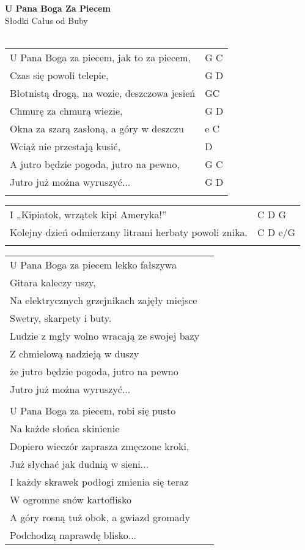 \documentclass[a5paper]{article}
\begin{document}


\noindent
\fontsize{12pt}{15pt}\selectfont
\textbf{U Pana Boga Za Piecem} \\
\fontsize{8pt}{10pt}\selectfont
Słodki Całus od Buby \\ \\
\fontsize{10pt}{12pt}\selectfont
{}
\begin{tabular}{@{}p{9.5cm}p{3cm}@{}}
\noindent
U Pana Boga za piecem, jak to za piecem, & G C \\
Czas się powoli telepie, & G D \\
Błotnistą drogą, na wozie, deszczowa jesień & GC \\
Chmurę za chmurą wiezie, & G D \\
Okna za szarą zasłoną, a góry w deszczu & e C \\
Wciąż nie przestają kusić, & D \\
A jutro będzie pogoda, jutro na pewno, & G C \\
Jutro już można wyruszyć... & G D \\ \\
\end{tabular}

\noindent
\begin{tabular}{@{}p{8.5cm}p{3cm}@{}}
I „Kipiatok, wrzątek kipi Ameryka!” & C D G \\
Kolejny dzień odmierzany litrami herbaty powoli znika. & C D e/G \\ \\
\end{tabular}

\noindent
\begin{tabular}{@{}p{8.5cm}p{3cm}@{}}
U Pana Boga za piecem lekko fałszywa \\
Gitara kaleczy uszy, \\
Na elektrycznych grzejnikach zajęły miejsce \\
Swetry, skarpety i buty. \\
Ludzie z mgły wolno wracają ze swojej bazy \\
Z chmielową nadzieją w duszy \\
że jutro będzie pogoda, jutro na pewno \\
Jutro już można wyruszyć... \\ \\

U Pana Boga za piecem, robi się pusto \\
Na każde słońca skinienie \\
Dopiero wieczór zaprasza zmęczone kroki, \\
Już słychać jak dudnią w sieni... \\
I każdy skrawek podłogi zmienia się teraz \\
W ogromne snów kartoflisko \\
A góry rosną tuż obok, a gwiazd gromady \\
Podchodzą naprawdę blisko... 
\end{tabular}
\end{document}
